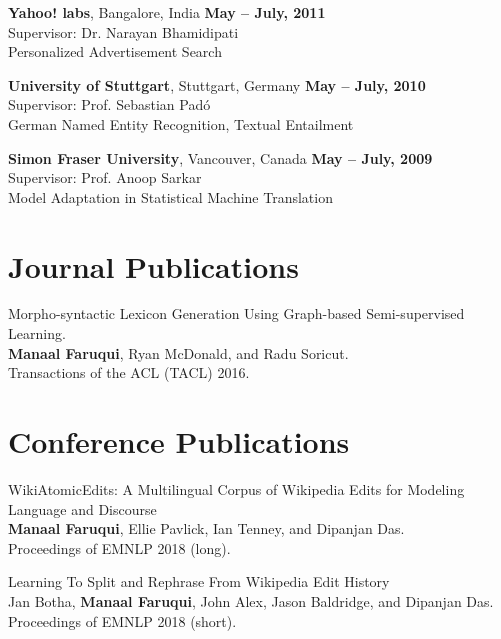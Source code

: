 \documentclass[margin,line]{res}
\begin{document}
\begin{resume}
{\bf Yahoo! labs}, Bangalore, India \hfill {\bf May -- July, 2011}\\
Supervisor: Dr. Narayan Bhamidipati\\
Personalized Advertisement Search

{\bf University of Stuttgart}, Stuttgart, Germany \hfill {\bf May -- July, 2010}\\
Supervisor: Prof. Sebastian Pad\'{o} \\
German Named Entity Recognition, Textual Entailment

{\bf Simon Fraser University}, Vancouver, Canada \hfill {\bf May -- July, 2009}\\
Supervisor: Prof. Anoop Sarkar\\
Model Adaptation in Statistical Machine Translation

\vspace{.2cm}
\section{\sc Journal Publications}

Morpho-syntactic Lexicon Generation Using Graph-based Semi-supervised Learning.\\
\textbf{Manaal Faruqui}, Ryan McDonald, and Radu Soricut.\\
Transactions of the ACL (TACL) 2016.

\vspace{.2cm}
\section{\sc Conference Publications}

WikiAtomicEdits: A Multilingual Corpus of Wikipedia Edits for Modeling Language and Discourse\\
\textbf{Manaal Faruqui}, Ellie Pavlick, Ian Tenney, and Dipanjan Das.\\
Proceedings of EMNLP 2018 (long).

Learning To Split and Rephrase From Wikipedia Edit History\\
Jan Botha, \textbf{Manaal Faruqui}, John Alex, Jason Baldridge, and Dipanjan Das.\\
Proceedings of EMNLP 2018 (short).


\end{resume}
\end{document}
